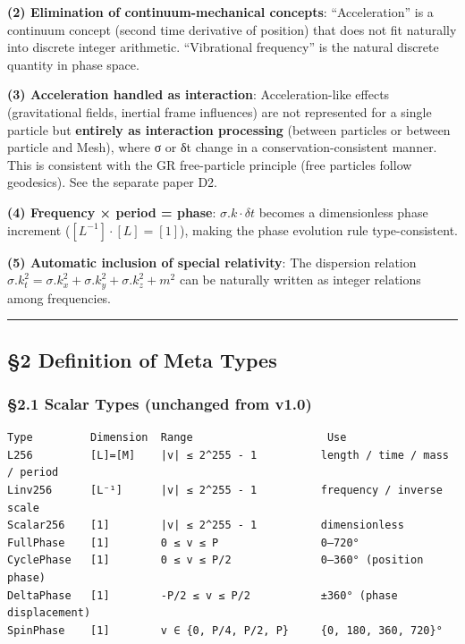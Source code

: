 \documentclass[a4paper,11pt]{article}
\begin{document}
\textbf{(2) Elimination of continuum-mechanical concepts}:
``Acceleration'' is a continuum concept (second time derivative of
position) that does not fit naturally into discrete integer arithmetic.
``Vibrational frequency'' is the natural discrete quantity in phase
space.

\textbf{(3) Acceleration handled as interaction}: Acceleration-like
effects (gravitational fields, inertial frame influences) are not
represented for a single particle but \textbf{entirely as interaction
processing} (between particles or between particle and Mesh), where σ or
δt change in a conservation-consistent manner. This is consistent with
the GR free-particle principle (free particles follow geodesics). See
the separate paper D2.

\textbf{(4) Frequency × period = phase}: \(\sigma.k \cdot \delta t\)
becomes a dimensionless phase increment (\([L^{-1}] \cdot [L] = [1]\)),
making the phase evolution rule type-consistent.

\textbf{(5) Automatic inclusion of special relativity}: The dispersion
relation
\(\sigma.k_t^2 = \sigma.k_x^2 + \sigma.k_y^2 + \sigma.k_z^2 + m^2\) can
be naturally written as integer relations among frequencies.

\begin{center}\rule{0.5\linewidth}{0.5pt}\end{center}

\subsection{§2 Definition of Meta Types}\label{definition-of-meta-types}

\subsubsection{§2.1 Scalar Types (unchanged from
v1.0)}\label{scalar-types-unchanged-from-v1.0}

\begin{verbatim}
Type         Dimension  Range                     Use
L256         [L]=[M]    |v| ≤ 2^255 - 1          length / time / mass / period
Linv256      [L⁻¹]      |v| ≤ 2^255 - 1          frequency / inverse scale
Scalar256    [1]        |v| ≤ 2^255 - 1          dimensionless
FullPhase    [1]        0 ≤ v ≤ P                0–720°
CyclePhase   [1]        0 ≤ v ≤ P/2              0–360° (position phase)
DeltaPhase   [1]        -P/2 ≤ v ≤ P/2           ±360° (phase displacement)
SpinPhase    [1]        v ∈ {0, P/4, P/2, P}     {0, 180, 360, 720}°
\end{verbatim}
\end{document}
